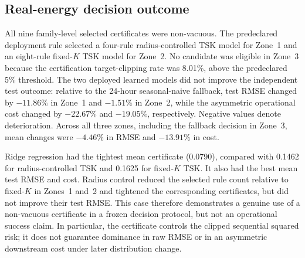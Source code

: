 \subsection{Real-energy decision outcome}
All nine family-level selected certificates were non-vacuous. The predeclared deployment rule selected a four-rule radius-controlled TSK model for Zone~1 and an eight-rule fixed-$K$ TSK model for Zone~2. No candidate was eligible in Zone~3 because the certification target-clipping rate was 8.01\%, above the predeclared 5\% threshold. The two deployed learned models did not improve the independent test outcome: relative to the 24-hour seasonal-naive fallback, test RMSE changed by $-11.86\%$ in Zone~1 and $-1.51\%$ in Zone~2, while the asymmetric operational cost changed by $-22.67\%$ and $-19.05\%$, respectively. Negative values denote deterioration. Across all three zones, including the fallback decision in Zone~3, mean changes were $-4.46\%$ in RMSE and $-13.91\%$ in cost.

Ridge regression had the tightest mean certificate (0.0790), compared with 0.1462 for radius-controlled TSK and 0.1625 for fixed-$K$ TSK. It also had the best mean test RMSE and cost. Radius control reduced the selected rule count relative to fixed-$K$ in Zones~1 and~2 and tightened the corresponding certificates, but did not improve their test RMSE. This case therefore demonstrates a genuine use of a non-vacuous certificate in a frozen decision protocol, but not an operational success claim. In particular, the certificate controls the clipped sequential squared risk; it does not guarantee dominance in raw RMSE or in an asymmetric downstream cost under later distribution change.
